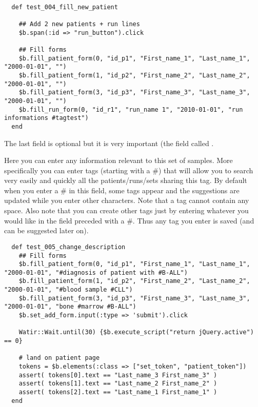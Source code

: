 \begin{verbatim}
 
  def test_004_fill_new_patient

    ## Add 2 new patients + run lines
    $b.span(:id => "run_button").click

    ## Fill forms
    $b.fill_patient_form(0, "id_p1", "First_name_1", "Last_name_1", "2000-01-01", "")
    $b.fill_patient_form(1, "id_p2", "First_name_2", "Last_name_2", "2000-01-01", "")
    $b.fill_patient_form(3, "id_p3", "First_name_3", "Last_name_3", "2000-01-01", "")
    $b.fill_run_form(0, "id_r1", "run_name 1", "2010-01-01", "run informations #tagtest")
  end

\end{verbatim}

The last field is optional but it is very important (the field called
.

Here you can enter any information relevant to this set of samples.
More specifically you can enter tags (starting with a \#) that will allow
you to search very easily and quickly all the patients/runs/sets sharing
this tag.
By default when you enter a \# in this field, some tags appear and the
suggestions are  updated while you enter other characters.
Note that a tag cannot contain any space.
Also note that you can create other tags just by entering whatever you would
like in the field preceded with a \#. Thus any tag you enter is saved (and
can be suggested later on).

\begin{verbatim}
  def test_005_change_description
    ## Fill forms
    $b.fill_patient_form(0, "id_p1", "First_name_1", "Last_name_1", "2000-01-01", "#diagnosis of patient with #B-ALL")
    $b.fill_patient_form(1, "id_p2", "First_name_2", "Last_name_2", "2000-01-01", "#blood sample #CLL")
    $b.fill_patient_form(3, "id_p3", "First_name_3", "Last_name_3", "2000-01-01", "bone #marrow #B-ALL")
    $b.set_add_form.input(:type => 'submit').click

    Watir::Wait.until(30) {$b.execute_script("return jQuery.active") == 0}

    # land on patient page
    tokens = $b.elements(:class => ["set_token", "patient_token"])
    assert( tokens[0].text == "Last_name_3 First_name_3" )
    assert( tokens[1].text == "Last_name_2 First_name_2" )
    assert( tokens[2].text == "Last_name_1 First_name_1" )
  end

\end{verbatim}

